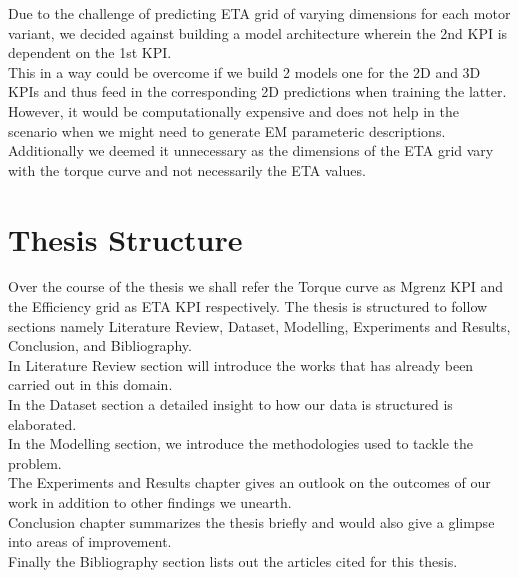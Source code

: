 \documentclass{report} %
\begin{document}
Due to the challenge of predicting ETA grid of varying dimensions for each motor variant, we decided against building a model architecture wherein the 2nd KPI is dependent on the 1st KPI. \\
This in a way could be overcome if we build 2 models one for the 2D and 3D KPIs and thus feed in the corresponding 2D predictions when training the latter. \\
However, it would be computationally expensive and does not help in the scenario when we might need to generate \ac{EM} parameteric descriptions.
Additionally we deemed it unnecessary as the dimensions of the ETA grid vary with the torque curve and not necessarily the ETA values. \\

\section{Thesis Structure}\label{sec:Thesis Structure}

Over the course of the thesis we shall refer the Torque curve as Mgrenz KPI and the Efficiency grid as ETA KPI respectively.
The thesis is structured to follow sections namely Literature Review, Dataset, Modelling, Experiments and Results, Conclusion, and Bibliography.\\
In Literature Review section will introduce the works that has already been carried out in this domain. \\
In the Dataset section a detailed insight to how our data is structured is elaborated.\\
In the Modelling section, we introduce the methodologies used to tackle the problem. \\
The Experiments and Results chapter gives an outlook on the outcomes of our work in addition to other findings we unearth.\\ 
Conclusion chapter summarizes the thesis briefly and would also give a glimpse into areas of improvement. \\
Finally the Bibliography section lists out the articles cited for this thesis.\\
\newpage 
\end{document}
